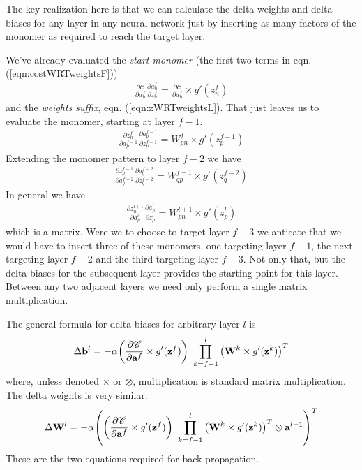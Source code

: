\documentclass[twocolumn]{revtex4-1}
\newcommand{\bld}[1]{\vectorbold{#1}}
\newcommand{\cC}{\mathscr{C}}
\newcommand{\parpar}[2]{\frac{\partial #1}{\partial #2}}
\begin{document}
The key realization here is that we can calculate the delta weights and delta biases for any layer in any neural network just by inserting as many factors of the monomer as required to reach the target layer.

We've already evaluated the \textit{start monomer} (the first two terms in eqn. (\ref{eqn:costWRTweightsF}))
\begin{align}
    \label{eqn:startMonomer}
    \parpar{\cC}{a^f_n} \parpar{a^f_n}{z^f_n} = \parpar{\cC}{a^f_n} \times g'(z^f_n)
\end{align}
and the \textit{weights suffix}, eqn. (\ref{eqn:zWRTweightsL}). That just leaves us to evaluate the monomer, starting at layer $f-1$.
\begin{align}
    \label{eqn:monomerAtFm1}
    \parpar{z^f_n}{a^{f-1}_p} \parpar{a^{f-1}_p}{z^{f-1}_p} = W^f_{p n} \times g'(z^{f-1}_p)
\end{align}
Extending the monomer pattern to layer $f-2$ we have
\begin{align}
    \label{eqn:monomerAtFm2}
    \parpar{z^{f-1}_p}{a^{f-2}_q} \parpar{a^{f-2}_q}{z^{f-2}_q} = W^{f-1}_{q p} \times g'(z^{f-2}_q)
\end{align}
In general we have 
\begin{align}
    \label{eqn:monomerForTargetL}
    \parpar{z^{l+1}_n}{a^l_p} \parpar{a^l_p}{z^l_p} = W^{l+1}_{p n} \times g'(z^l_p)
\end{align}
which is a matrix. Were we to choose to target layer $f-3$ we anticate that we would have to insert three of these monomers, one targeting layer $f-1$, the next targeting layer $f-2$ and the third targeting layer $f-3$. Not only that, but the delta biases for the subsequent layer provides the starting point for this layer. Between any two adjacent layers we need only perform a single matrix multiplication.

The general formula for delta biases for arbitrary layer $l$ is
\begin{align}
    \label{eqn:deltaBiases}
    \Delta \bld{b}^l = -\alpha {\left( \parpar{\cC}{\bld{a}^f} \times g'(\bld{z}^f) \right) \
        \prod_{k = f-1}^l {\left( \bld{W}^k \times g'(\bld{z}^k) \right)}^T}
\end{align}
where, unless denoted $\times$ or $\otimes$, multiplication is standard matrix multiplication. The delta weights is very similar.
\begin{align}
    \label{eqn:deltaWeights}
    \Delta \bld{W}^l = - \alpha {\left( \left( \parpar{\cC}{\bld{a}^f} \times g'(\bld{z}^f) \right) \
        \prod_{k = f-1}^l {\left( \bld{W}^k \times g'(\bld{z}^k) \right)}^T \otimes \bld{a}^{l-1} \right)}^T
\end{align}
These are the two equations required for back-propagation. 
\end{document}
